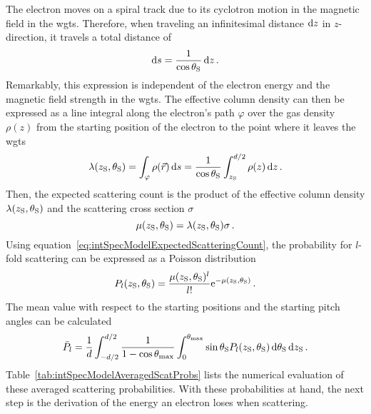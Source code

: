 The electron moves on a spiral track due to its cyclotron motion in the magnetic field in the \gls{wgts}. Therefore, when traveling an infinitesimal distance $\mathop{}\!\mathrm{d} z$ in $z$-direction, it travels a total distance of
\begin{equation}
\label{eq:intSpecModelInfinitesimalElecPath}
\mathop{}\!\mathrm{d} s = \frac{1}{\cos\theta_\mathrm{S}} \mathop{}\!\mathrm{d} z 
\text{\,.}
\end{equation}
Remarkably, this expression is independent of the electron energy and the magnetic field strength in the \gls{wgts}. The effective column density can then be expressed as a line integral along the electron's path $\varphi$ over the gas density~$\rho(z)$ from the starting position of the electron to the point where it leaves the \gls{wgts}
\begin{equation}
\label{eq:intSpecModelEffColumnDensity}
\lambda(z_\mathrm{S},\theta_\mathrm{S}) = 
\int_{\varphi} \rho(\Vec{r})\mathop{}\!\mathrm{d} s =
\frac{1}{\cos\theta_\mathrm{S}}
\int_{z_\mathrm{S}}^{d/2} \rho(z)\mathop{}\!\mathrm{d} z
\text{\,.}
\end{equation}
Then, the expected scattering count is the product of the effective column density $\lambda(z_\mathrm{S},\theta_\mathrm{S})$ and the scattering cross section $\sigma$~\cite{Groh2015}
\begin{equation}
\label{eq:intSpecModelExpectedScatteringCount}
\mu(z_\mathrm{S}, \theta_\mathrm{S}) = \lambda(z_\mathrm{S},\theta_\mathrm{S}) \sigma \text{\,.}
\end{equation}
Using equation~\eqref{eq:intSpecModelExpectedScatteringCount}, the probability for $l$-fold scattering can be expressed as a Poisson distribution~\cite{Groh2015}
\begin{equation}
\label{eq:intSpecModelNonAveragedScatProbs}
P_l(z_\mathrm{S}, \theta_\mathrm{S}) = 
\frac{
	\mu(z_\mathrm{S}, \theta_\mathrm{S})^l
}{l!}
\mathrm{e}^{-\mu(z_\mathrm{S}, \theta_\mathrm{S})} \text{\,.}
\end{equation}
The mean value with respect to the starting positions and the starting pitch angles can be calculated~\cite{Groh2015}
\begin{equation}
	\label{eq:intSpecModelAveragedScatProbs}
	\bar{P}_l =
	\frac{1}{d}
	\int_{-d/2}^{d/2}
		\frac{1}{1-\cos\theta_\mathrm{max}}
		\int_{0}^{\theta_\mathrm{max}}
			\sin\theta_\mathrm{S}
			P_l(z_\mathrm{S},\theta_\mathrm{S})
		\mathop{}\!\mathrm{d} \theta_\mathrm{S}
	\mathop{}\!\mathrm{d} z_\mathrm{S}
	\text{\,.}
\end{equation}
Table~\ref{tab:intSpecModelAveragedScatProbs} lists the numerical evaluation of these averaged scattering probabilities. With these probabilities at hand, the next step is the derivation of the energy an electron loses when scattering.

